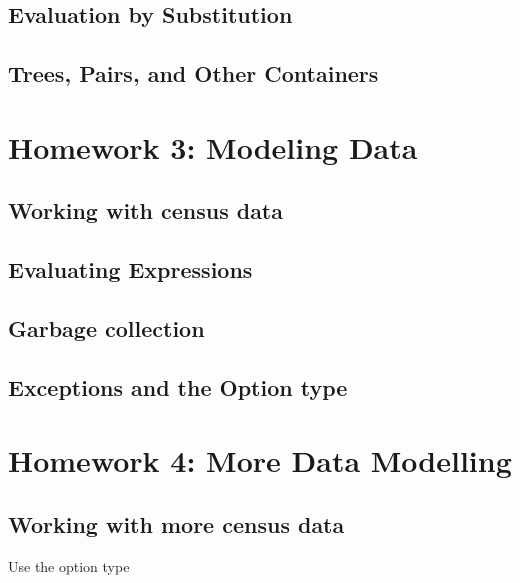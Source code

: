 \documentclass{book}
\begin{document}
\section{Evaluation by Substitution}


\newlecture

\section{Trees, Pairs, and Other Containers}

\chapter{Homework 3: Modeling Data}

\section{Working with census data}

\newlecture

\section{Evaluating Expressions}

\section{Garbage collection}

\newlecture

\section{Exceptions and the Option type}


\chapter{Homework 4: More Data Modelling}

\section{Working with more census data}

Use the option type

\newlecture

\end{document}
